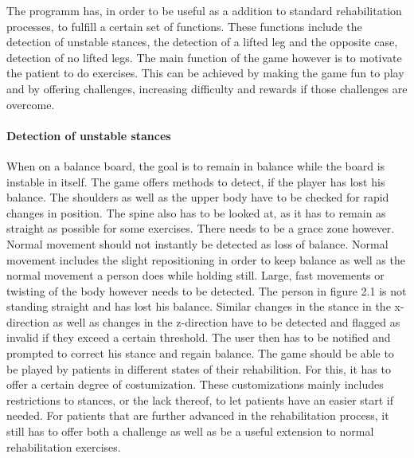 The programm has, in order to be useful as a addition to standard rehabilitation processes, to fulfill a certain set of functions. These functions include the detection of unstable stances, the detection of a lifted leg and the opposite case, detection of no lifted legs. The main function of the game however is to motivate the patient to do exercises. This can be achieved by making the game fun to play and by offering challenges, increasing difficulty and rewards if those challenges are overcome.
\paragraph{Detection of unstable stances}
When on a balance board, the goal is to remain in balance while the board is instable in itself. The game offers methods to detect, if the player has lost his balance. The shoulders as well as the upper body have to be checked for rapid changes in position. The spine also has to be looked at, as it has to remain as straight as possible for some exercises. There needs to be a grace zone however. Normal movement should not instantly be detected as loss of balance. Normal movement includes the slight repositioning in order to keep balance as well as the normal movement a person does while holding still. Large, fast movements or twisting of the body however needs to be detected. The person in figure 2.1 is not standing straight and has lost his balance. Similar changes in the stance in the x-direction as well as changes in the z-direction have to be detected and flagged as invalid if they exceed a certain threshold. The user then has to be notified and prompted to correct his stance and regain balance.
The game should be able to be played by patients in different states of their rehabilition. For this, it has to offer a certain degree of costumization. These customizations mainly includes restrictions to stances, or the lack thereof, to let patients have an easier start if needed. For patients that are further advanced in the rehabilitation process, it still has to offer both a challenge as well as be a useful extension to normal rehabilitation exercises.

